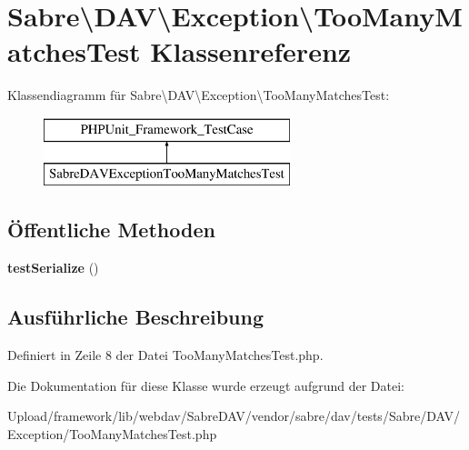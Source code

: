 \hypertarget{class_sabre_1_1_d_a_v_1_1_exception_1_1_too_many_matches_test}{}\section{Sabre\textbackslash{}D\+AV\textbackslash{}Exception\textbackslash{}Too\+Many\+Matches\+Test Klassenreferenz}
\label{class_sabre_1_1_d_a_v_1_1_exception_1_1_too_many_matches_test}
Klassendiagramm für Sabre\textbackslash{}D\+AV\textbackslash{}Exception\textbackslash{}Too\+Many\+Matches\+Test\+:\begin{figure}[H]
\begin{center}
\leavevmode
\includegraphics[height=2.000000cm]{class_sabre_1_1_d_a_v_1_1_exception_1_1_too_many_matches_test}
\end{center}
\end{figure}
\subsection*{Öffentliche Methoden}
\begin{DoxyCompactItemize}
\item 
\mbox{\label{class_sabre_1_1_d_a_v_1_1_exception_1_1_too_many_matches_test_ae1b731e2a36ac8767d4d8ee28a68caf9}} 
{\bfseries test\+Serialize} ()
\end{DoxyCompactItemize}


\subsection{Ausführliche Beschreibung}


Definiert in Zeile 8 der Datei Too\+Many\+Matches\+Test.\+php.



Die Dokumentation für diese Klasse wurde erzeugt aufgrund der Datei\+:\begin{DoxyCompactItemize}
\item 
Upload/framework/lib/webdav/\+Sabre\+D\+A\+V/vendor/sabre/dav/tests/\+Sabre/\+D\+A\+V/\+Exception/Too\+Many\+Matches\+Test.\+php\end{DoxyCompactItemize}
